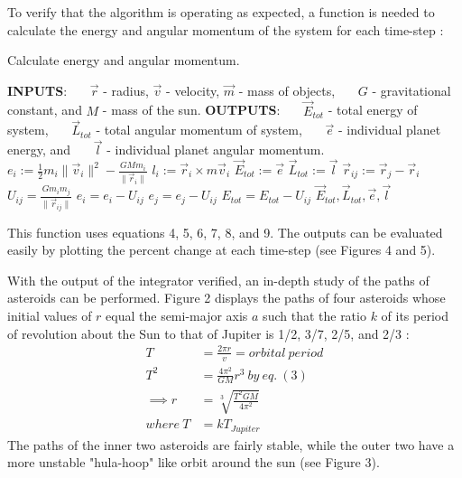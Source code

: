 \documentclass{article}%
\begin{document}
To verify that the algorithm is operating as expected, a function is needed to calculate the energy and angular momentum of the system for each time-step :

\begin{algorithm}[h!]
  \caption{Calculate energy and angular momentum.}
  \begin{algorithmic} 
  \STATE \textbf{INPUTS}: 
  \STATE \ \ \ $\vec r$ - radius, $\vec v$ - velocity, $\vec m$ - mass of objects,
  \STATE \ \ \ $G$ - gravitational constant, and $M$ - mass of the sun.
  \STATE \textbf{OUTPUTS}: 
  \STATE \ \ \ $\vec E_{tot}$ - total energy of system, 
  \STATE \ \ \ $\vec L_{tot}$ - total angular momentum of system,
  \STATE \ \ \ $\vec e$ - individual planet energy, and
  \STATE \ \ \ $\vec l$ - individual planet angular momentum.
      \STATE $e_i := \frac {1}{2} m_i \|\vec v_i\|^2 - \frac{GMm_i}{\|\vec r_i\|}$
      \STATE $l_i := \vec r_i \times m \vec v_i$
    \ENDFOR
    \STATE $\vec E_{tot} := \vec e$
    \STATE $\vec L_{tot} := \vec l$
        \STATE $\vec r_{ij} := \vec r_{j} - \vec r_{i}$
        \STATE $U_{ij} = \frac{Gm_im_j}{\|\vec r_{ij}\|}$
        \STATE $e_i = e_i - U_{ij}$
        \STATE $e_j = e_j - U_{ij}$
        \STATE $E_{tot} = E_{tot} - U_{ij}$
      \ENDFOR
    \ENDFOR
    \RETURN $\vec E_{tot}, \vec L_{tot}, \vec e, \vec l$
  \end{algorithmic}
\end{algorithm}
This function uses equations 4, 5, 6, 7, 8, and 9.  The outputs can be evaluated easily by plotting the percent change at each time-step (see Figures 4 and 5).

With the output of the integrator verified, an in-depth study of the paths of asteroids can be performed.  Figure 2 displays the paths of four asteroids whose initial values of $r$ equal the semi-major axis $a$ such that the ratio $k$ of its period of revolution about the Sun to that of Jupiter is 1/2, 3/7, 2/5, and 2/3 :
\begin{align*}
  T &= \frac {2 \pi r}{v} = orbital\ period\\
  T^2 &= \frac{4 \pi^2}{GM}r^3\ by\ eq.\ (3)\\
  \implies r &= \sqrt[3]{\frac{T^2 GM}{4\pi^2}}\\
  where\ T &= k T_{Jupiter}
\end{align*}
The paths of the inner two asteroids are fairly stable, while the outer two have a more unstable "hula-hoop" like orbit around the sun (see Figure 3).
\end{document}
